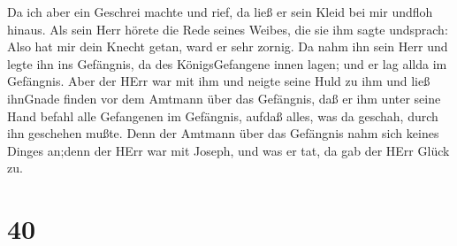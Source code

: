  Da ich aber ein Geschrei machte und rief, da ließ er sein
Kleid bei mir undfloh hinaus.  Als sein Herr hörete die
Rede seines Weibes, die sie ihm sagte undsprach: Also hat mir dein
Knecht getan, ward er sehr zornig.  Da nahm ihn sein Herr
und legte ihn ins Gefängnis, da des KönigsGefangene innen lagen; und er
lag allda im Gefängnis.  Aber der HErr war mit ihm und
neigte seine Huld zu ihm und ließ ihnGnade finden vor dem Amtmann über
das Gefängnis,  daß er ihm unter seine Hand befahl alle
Gefangenen im Gefängnis, aufdaß alles, was da geschah, durch ihn
geschehen mußte.  Denn der Amtmann über das Gefängnis nahm
sich keines Dinges an;denn der HErr war mit Joseph, und was er tat, da
gab der HErr Glück zu.

\hypertarget{section-39}{%
\section{40}\label{section-39}}

